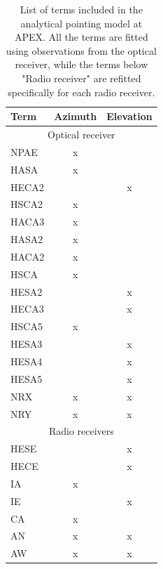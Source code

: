 \begin{table}[!htbp]
    \centering
    \caption[List of terms in the analytical pointing model at APEX]{List of terms included in the analytical pointing model at APEX.
    All the terms are fitted using observations from the optical receiver,
    while the terms below "Radio receiver" are refitted specifically for each radio receiver. }
    \begin{tabular}{lcc}
        \toprule
    \textbf{Term} & \textbf{Azimuth} & \textbf{Elevation} \\
    \hline
    \multicolumn{3}{c}{Optical receiver} \\ 
    \hline
    NPAE  & x &  \\
    HASA  & x &  \\
    HECA2 &  & x \\
    HSCA2 & x &  \\
    HACA3 & x &  \\
    HASA2 & x &  \\
    HACA2 & x &  \\
    HSCA  & x &  \\
    HESA2 &  & x \\
    HECA3 &  & x \\
    HSCA5 & x &  \\
    HESA3 &  & x \\
    HESA4 &  & x \\
    HESA5 &  & x \\
    NRX   & x & x \\
    NRY   & x & x \\
    \hline
    \multicolumn{3}{c}{Radio receivers} \\
    \hline
    HESE  &  & x \\
    HECE  &  & x \\
    IA    & x &  \\
    IE    &  & x \\
    CA    & x &  \\
    AN    & x & x \\
    AW    & x & x \\
    \bottomrule 
    \end{tabular}
    \label{tab:analytical_terms}
\end{table}


